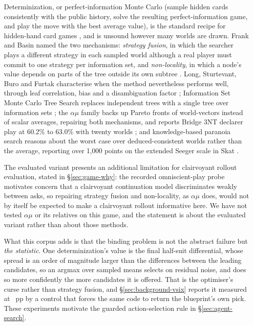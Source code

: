 Determinization, or perfect-information Monte Carlo (sample hidden cards consistently with the
public history, solve the resulting perfect-information game, and play the move with the best average
value), is the standard recipe for hidden-hand card games \cite{levy,ginsberg-gib}, and is
unsound however many worlds are drawn. Frank and Basin named the two mechanisms: \emph{strategy
fusion}, in which the searcher plays a different strategy in each sampled world although a real
player must commit to one strategy per information set, and \emph{non-locality}, in which a node's
value depends on parts of the tree outside its own subtree
\cite{frank-basin-ai,frank-basin-aaai}. Long, Sturtevant, Buro and Furtak characterise when the
method nevertheless performs well, through leaf correlation, bias and a disambiguation factor
\cite{long-pimc}; Information Set Monte Carlo Tree Search replaces independent trees with a single
tree over information sets \cite{cowling-ismcts,goodman-ris}; the $\alpha\mu$ family backs up Pareto
fronts of world-vectors instead of scalar averages, repairing both mechanisms, and reports Bridge
3NT declarer play at 60.2\% to 63.0\% with twenty worlds \cite{cazenave2019alphamu}; and
knowledge-based paranoia search reasons about the worst case over deduced-consistent worlds rather
than the average, reporting over 1{,}000 points on the extended Seeger scale in Skat
\cite{edelkamp2021paranoia}.

The evaluated variant presents an additional limitation for clairvoyant rollout evaluation, stated
in \S\ref{sec:game-why}: the recorded omniscient-play probe motivates concern that a clairvoyant
continuation model discriminates weakly between asks, so repairing strategy fusion and
non-locality, as $\alpha\mu$ does, would not by itself be expected to make a clairvoyant rollout
informative here. We have not tested $\alpha\mu$ or its relatives on this
game, and the statement is about the evaluated variant rather than about those methods.

What this corpus adds is that the binding problem is not the abstract failure but \emph{the
statistic}. One determinization's value is the final half-suit differential, whose spread is an
order of magnitude larger than the differences between the leading candidates, so an argmax over
sampled means selects on residual noise, and does so more confidently the more candidates it is
offered. That is the optimiser's curse rather than strategy fusion, and \S\ref{sec:background-vsix}
reports it measured at \vsixCurseGap{}~pp by a control that forces the same code to return the
blueprint's own pick. These experiments motivate the guarded action-selection rule in
\S\ref{sec:agent-search}.

